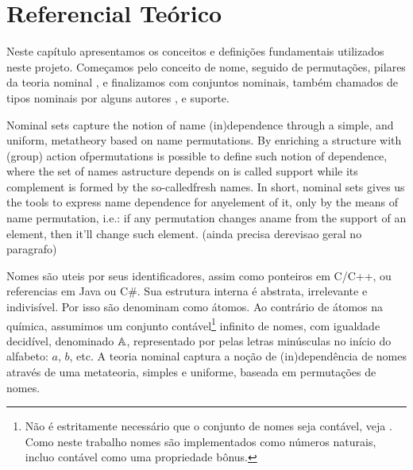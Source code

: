 \chapter{Referencial Teórico}\label{chp:ref-teorico}

Neste capítulo apresentamos os conceitos e definições fundamentais utilizados neste projeto. Começamos pelo conceito de nome, seguido de permutações, pilares da teoria nominal \cite{Gabbay2002,Pitts2003,Pitts2013}, e finalizamos com conjuntos nominais, também chamados de tipos nominais por alguns autores \cite{Urban2008,Choudhury2015}, e suporte.

Nominal sets capture the notion of name (in)dependence through a simple, and uniform, metatheory based on name permutations. By enriching a structure with (group) action ofpermutations is possible to define such notion of dependence, where the set of names astructure depends on is called support while its complement is formed by the so-calledfresh names. In short, nominal sets gives us the tools to express name dependence for anyelement of it, only by the means of name permutation, i.e.: if any permutation changes aname from the support of an element, then it’ll change such element.  (ainda precisa derevisao geral no paragrafo)

Nomes são uteis por seus identificadores, assim como ponteiros em C/C++, ou referencias em Java ou C\#. Sua estrutura interna é abstrata, irrelevante e indivisível. Por isso são denominam como átomos. Ao contrário de átomos na química, assumimos um conjunto contável\footnote{Não é estritamente necessário que o conjunto de nomes seja contável, veja \cite[Exercício 6.2, página 109]{Pitts2013}. Como neste trabalho nomes são implementados como números naturais, incluo contável como uma propriedade bônus.} infinito de nomes, com igualdade decidível, denominado $\mathbb{A}$, representado por pelas letras minúsculas no início do alfabeto: $a$, $b$, etc. A teoria nominal captura a noção de (in)dependência de nomes através de uma metateoria, simples e uniforme, baseada em permutações de nomes.

